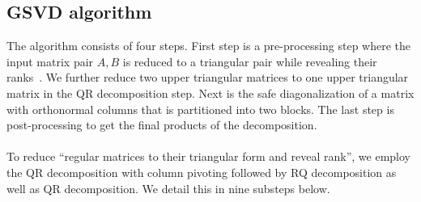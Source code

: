 \subsection{GSVD algorithm} \label{alg}
The algorithm consists of four steps. First step 
is a pre-processing step where the input matrix pair $A, B$ is
reduced to a triangular pair while revealing their ranks~\cite{bai1993new}.
We further reduce two upper triangular matrices to one upper triangular matrix in the QR decomposition step. Next is the safe diagonalization of a matrix with orthonormal columns that is partitioned into two blocks. \cite{van1976generalizing} The last step is post-processing to get the final products of the decomposition. 
    
\paragraph{}
To reduce ``regular matrices to their triangular form and reveal rank'', 
we employ the QR decomposition with column pivoting followed by 
RQ decomposition \cite{golub2013matrix} as well as QR decomposition. 
We detail this in nine substeps below.
